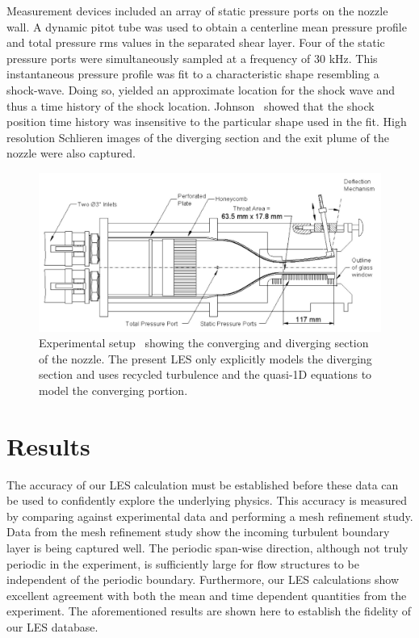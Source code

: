 \documentclass[]{aiaa-tc}%
\begin{document}
Measurement devices included an array of static pressure ports on the nozzle wall.  A dynamic pitot tube was used to obtain a centerline mean pressure profile and total pressure rms values in the separated shear layer.  Four of the static pressure ports were simultaneously sampled at a frequency of 30 kHz.  This instantaneous pressure profile was fit to a characteristic shape resembling a shock-wave.  Doing so, yielded an approximate location for the shock wave and thus a time history of the shock location.  Johnson~\cite{Papam:10} showed that the shock position time history was insensitive to the particular shape used in the fit.  High resolution Schlieren images of the diverging section and the exit plume of the nozzle were also captured.


\begin{figure}[!h]%
	\centering
  	\includegraphics[width = 6in]{../../data/experiment/exp_setup.png}
	\caption{Experimental setup~\cite{Papam:10} showing the converging and diverging section of the nozzle.  The present LES only explicitly models the diverging section and uses recycled turbulence and the quasi-1D equations to model the converging portion. }
 	\label{fig:exp_setup}
\end{figure}


\clearpage
\section{Results}

The accuracy of our LES calculation must be established before these data can be used to confidently explore the underlying physics.  This accuracy is measured by comparing against experimental data and performing a mesh refinement study.  Data from the mesh refinement study show the incoming turbulent boundary layer is being captured well.  The periodic span-wise direction, although not truly periodic in the experiment, is sufficiently large for flow structures to be independent of the periodic boundary.  Furthermore, our LES calculations show excellent agreement with both the mean and time dependent quantities from the experiment.  The aforementioned results are shown here to establish the fidelity of our LES database.
\end{document}
